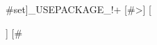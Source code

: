 {#set]_USEPACKAGE_!+
[#>]
[\usepackage[utf8x]{inputenc}
\usepackage[T1]{fontenc}
\usepackage{aeguill}
\usepackage{amssymb}
]
[#}
